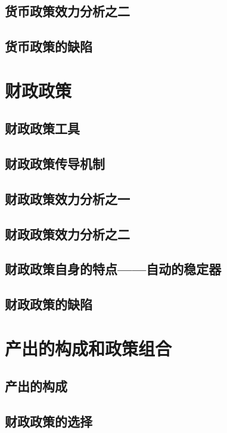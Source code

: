 \documentclass{article}
\begin{document}
\subsection{货币政策效力分析之二}

\subsection{货币政策的缺陷}


\section{财政政策}
\subsection{财政政策工具}

\subsection{财政政策传导机制}

\subsection{财政政策效力分析之一}

\subsection{财政政策效力分析之二}

\subsection{财政政策自身的特点——自动的稳定器}

\subsection{财政政策的缺陷}


\section{产出的构成和政策组合}
\subsection{产出的构成}

\subsection{财政政策的选择}
\end{document}
